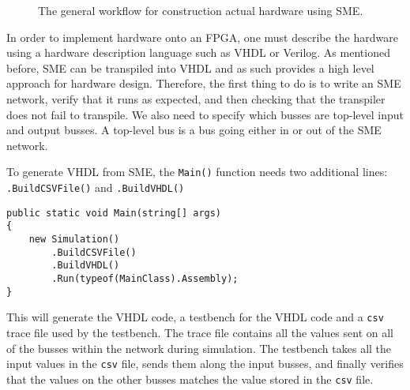 \begin{figure}
    \caption{The general workflow for construction actual hardware using SME.}
    \label{fig:general-workflow}
\end{figure}
In order to implement hardware onto an FPGA, one must describe the hardware
using a hardware description language such as VHDL or Verilog. As mentioned
before, SME can be transpiled into VHDL and as such provides a high level
approach for hardware design. Therefore, the first thing to do is to write an
SME network, verify that it runs as expected, and then checking that the
transpiler does not fail to transpile. We also need to specify which busses are
top-level input and output busses. A top-level
bus is a bus going either in or out of the SME network.

To generate VHDL from SME, the \texttt{Main()} function needs two additional
lines: \texttt{.BuildCSVFile()} and \texttt{.BuildVHDL()}
\begin{lstlisting}
public static void Main(string[] args)
{
    new Simulation()
        .BuildCSVFile()
        .BuildVHDL()
        .Run(typeof(MainClass).Assembly);
}
\end{lstlisting}
This will generate the VHDL code, a testbench for the VHDL code and a
\texttt{csv} trace file used by the testbench. The trace file contains all the
values sent on all of the busses within the network during simulation. The
testbench takes all the input values in the \texttt{csv} file, sends them along
the input busses, and finally verifies that the values on the other busses
matches the value stored in the \texttt{csv} file.

